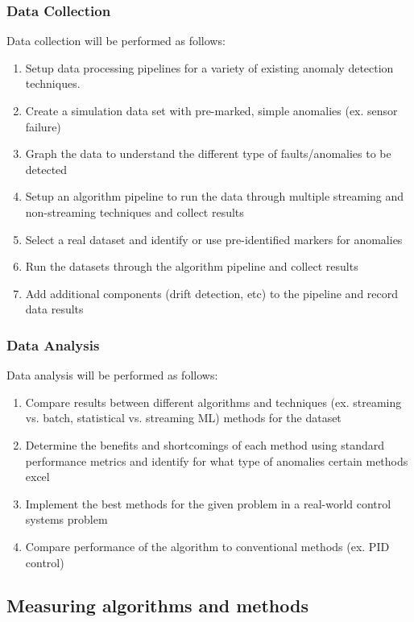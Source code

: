 \subsubsection{Data Collection}
Data collection will be performed as follows:
\begin{enumerate}
    \item Setup data processing pipelines for a variety of existing anomaly detection techniques.
    \item Create a simulation data set with pre-marked, simple anomalies (ex. sensor failure) 
    \item Graph the data to understand the different type of faults/anomalies to be detected
    \item Setup an algorithm pipeline to run the data through multiple streaming and non-streaming techniques and collect results
    \item Select a real dataset and identify or use pre-identified markers for anomalies
    \item Run the datasets through the algorithm pipeline and collect results
    \item Add additional components (drift detection, etc) to the pipeline and record data results 
\end{enumerate}

\subsubsection{Data Analysis}
Data  analysis will be performed as follows:
\begin{enumerate}
    \item Compare results between different algorithms and techniques (ex. streaming vs. batch, statistical vs. streaming ML) methods for the dataset 
    \item Determine the benefits and shortcomings of each method using standard performance metrics and identify for what type of anomalies certain methods excel
    \item Implement the best methods for the given problem in a real-world control systems problem
    \item Compare performance of the algorithm to conventional methods (ex. PID control)
\end{enumerate}

\subsection{Measuring algorithms and methods}


